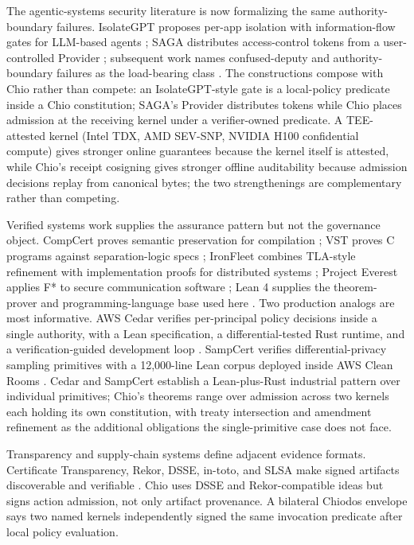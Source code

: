 The agentic-systems security literature is now formalizing the same authority-boundary failures. IsolateGPT proposes per-app isolation with information-flow gates for LLM-based agents \cite{isolategptNDSS2025}; SAGA distributes access-control tokens from a user-controlled Provider \cite{sagaNDSS2025}; subsequent work names confused-deputy and authority-boundary failures as the load-bearing class \cite{agenticFoundations2025}. The constructions compose with Chio rather than compete: an IsolateGPT-style gate is a local-policy predicate inside a Chio constitution; SAGA's Provider distributes tokens while Chio places admission at the receiving kernel under a verifier-owned predicate. A TEE-attested kernel (Intel TDX, AMD SEV-SNP, NVIDIA H100 confidential compute) gives stronger online guarantees because the kernel itself is attested, while Chio's receipt cosigning gives stronger offline auditability because admission decisions replay from canonical bytes; the two strengthenings are complementary rather than competing.

Verified systems work supplies the assurance pattern but not the governance object. CompCert proves semantic preservation for compilation \cite{leroy2009compcert}; VST proves C programs against separation-logic specs \cite{appel2015vst}; IronFleet combines TLA-style refinement with implementation proofs for distributed systems \cite{hawblitzel2015ironfleet}; Project Everest applies F* to secure communication software \cite{projectEverest}; Lean 4 supplies the theorem-prover and programming-language base used here \cite{demoura2021lean4}. Two production analogs are most informative. AWS Cedar verifies per-principal policy decisions inside a single authority, with a Lean specification, a differential-tested Rust runtime, and a verification-guided development loop \cite{cedarOOPSLA2024,cedarFSE2024}. SampCert verifies differential-privacy sampling primitives with a 12{,}000-line Lean corpus deployed inside AWS Clean Rooms \cite{sampcertPLDI2025}. Cedar and SampCert establish a Lean-plus-Rust industrial pattern over individual primitives; Chio's theorems range over admission across two kernels each holding its own constitution, with treaty intersection and amendment refinement as the additional obligations the single-primitive case does not face.

Transparency and supply-chain systems define adjacent evidence formats. Certificate Transparency, Rekor, DSSE, in-toto, and SLSA make signed artifacts discoverable and verifiable \cite{rfc9162,sigstoreSecurity,dsse,torres2019intoto,slsa}. Chio uses DSSE and Rekor-compatible ideas but signs action admission, not only artifact provenance. A bilateral Chiodos envelope says two named kernels independently signed the same invocation predicate after local policy evaluation.

